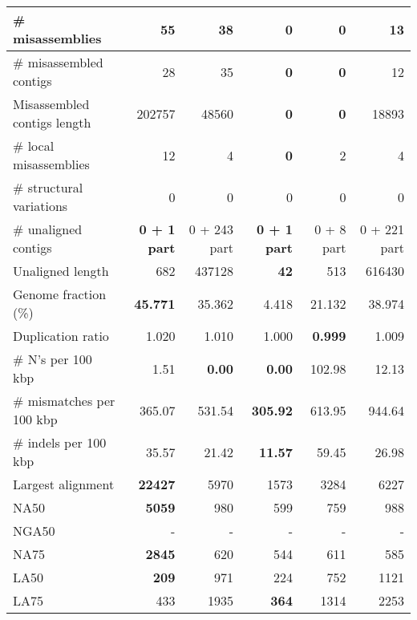 \documentclass[12pt,a4paper]{article}
\begin{document}
\begin{table}[ht]
\begin{center}
\begin{tabular}{|l*{5}{|r}|}
\# misassemblies & 55 & 38 & {\bf 0} & {\bf 0} & 13 \\ \hline
\# misassembled contigs & 28 & 35 & {\bf 0} & {\bf 0} & 12 \\ \hline
Misassembled contigs length & 202757 & 48560 & {\bf 0} & {\bf 0} & 18893 \\ \hline
\# local misassemblies & 12 & 4 & {\bf 0} & 2 & 4 \\ \hline
\# structural variations & 0 & 0 & 0 & 0 & 0 \\ \hline
\# unaligned contigs & {\bf 0 + 1 part} & 0 + 243 part & {\bf 0 + 1 part} & 0 + 8 part & 0 + 221 part \\ \hline
Unaligned length & 682 & 437128 & {\bf 42} & 513 & 616430 \\ \hline
Genome fraction (\%) & {\bf 45.771} & 35.362 & 4.418 & 21.132 & 38.974 \\ \hline
Duplication ratio & 1.020 & 1.010 & 1.000 & {\bf 0.999} & 1.009 \\ \hline
\# N's per 100 kbp & 1.51 & {\bf 0.00} & {\bf 0.00} & 102.98 & 12.13 \\ \hline
\# mismatches per 100 kbp & 365.07 & 531.54 & {\bf 305.92} & 613.95 & 944.64 \\ \hline
\# indels per 100 kbp & 35.57 & 21.42 & {\bf 11.57} & 59.45 & 26.98 \\ \hline
Largest alignment & {\bf 22427} & 5970 & 1573 & 3284 & 6227 \\ \hline
NA50 & {\bf 5059} & 980 & 599 & 759 & 988 \\ \hline
NGA50 & - & - & - & - & - \\ \hline
NA75 & {\bf 2845} & 620 & 544 & 611 & 585 \\ \hline
LA50 & {\bf 209} & 971 & 224 & 752 & 1121 \\ \hline
LA75 & 433 & 1935 & {\bf 364} & 1314 & 2253 \\ \hline
\end{tabular}
\end{center}
\end{table}
\end{document}
